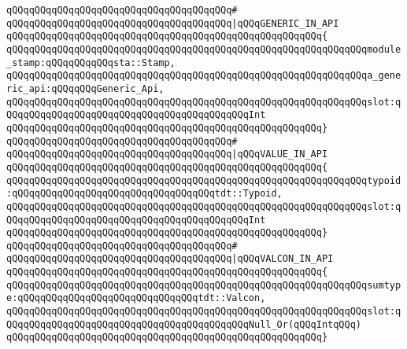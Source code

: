 \verb|qQQqqQQqqQQqqQQqqQQqqQQqqQQqqQQqqQQqqQQq#|\newline
\verb|qQQqqQQqqQQqqQQqqQQqqQQqqQQqqQQqqQQqqQQq|\verb#|qQQqGENERIC_IN_API#\newline
\verb|qQQqqQQqqQQqqQQqqQQqqQQqqQQqqQQqqQQqqQQqqQQqqQQqqQQqqQQq{|\newline
\verb|qQQqqQQqqQQqqQQqqQQqqQQqqQQqqQQqqQQqqQQqqQQqqQQqqQQqqQQqqQQqqQQqmodule_stamp:qQQqqQQqqQQqsta::Stamp,|\newline
\verb|qQQqqQQqqQQqqQQqqQQqqQQqqQQqqQQqqQQqqQQqqQQqqQQqqQQqqQQqqQQqqQQqa_generic_api:qQQqqQQqGeneric_Api,|\newline
\verb|qQQqqQQqqQQqqQQqqQQqqQQqqQQqqQQqqQQqqQQqqQQqqQQqqQQqqQQqqQQqqQQqslot:qQQqqQQqqQQqqQQqqQQqqQQqqQQqqQQqqQQqqQQqqQQqInt|\newline
\verb|qQQqqQQqqQQqqQQqqQQqqQQqqQQqqQQqqQQqqQQqqQQqqQQqqQQqqQQq}|\newline
\verb|qQQqqQQqqQQqqQQqqQQqqQQqqQQqqQQqqQQqqQQq#|\newline
\verb|qQQqqQQqqQQqqQQqqQQqqQQqqQQqqQQqqQQqqQQq|\verb#|qQQqVALUE_IN_API#\newline
\verb|qQQqqQQqqQQqqQQqqQQqqQQqqQQqqQQqqQQqqQQqqQQqqQQqqQQqqQQq{|\newline
\verb|qQQqqQQqqQQqqQQqqQQqqQQqqQQqqQQqqQQqqQQqqQQqqQQqqQQqqQQqqQQqqQQqtypoid:qQQqqQQqqQQqqQQqqQQqqQQqqQQqqQQqqQQqtdt::Typoid,|\newline
\verb|qQQqqQQqqQQqqQQqqQQqqQQqqQQqqQQqqQQqqQQqqQQqqQQqqQQqqQQqqQQqqQQqslot:qQQqqQQqqQQqqQQqqQQqqQQqqQQqqQQqqQQqqQQqqQQqInt|\newline
\verb|qQQqqQQqqQQqqQQqqQQqqQQqqQQqqQQqqQQqqQQqqQQqqQQqqQQqqQQq}|\newline
\verb|qQQqqQQqqQQqqQQqqQQqqQQqqQQqqQQqqQQqqQQq#|\newline
\verb|qQQqqQQqqQQqqQQqqQQqqQQqqQQqqQQqqQQqqQQq|\verb#|qQQqVALCON_IN_API#\newline
\verb|qQQqqQQqqQQqqQQqqQQqqQQqqQQqqQQqqQQqqQQqqQQqqQQqqQQqqQQq{|\newline
\verb|qQQqqQQqqQQqqQQqqQQqqQQqqQQqqQQqqQQqqQQqqQQqqQQqqQQqqQQqqQQqqQQqsumtype:qQQqqQQqqQQqqQQqqQQqqQQqqQQqqQQqtdt::Valcon,|\newline
\verb|qQQqqQQqqQQqqQQqqQQqqQQqqQQqqQQqqQQqqQQqqQQqqQQqqQQqqQQqqQQqqQQqslot:qQQqqQQqqQQqqQQqqQQqqQQqqQQqqQQqqQQqqQQqqQQqNull_Or(qQQqIntqQQq)|\newline
\verb|qQQqqQQqqQQqqQQqqQQqqQQqqQQqqQQqqQQqqQQqqQQqqQQqqQQqqQQq}|\newline
\newline
\newline
